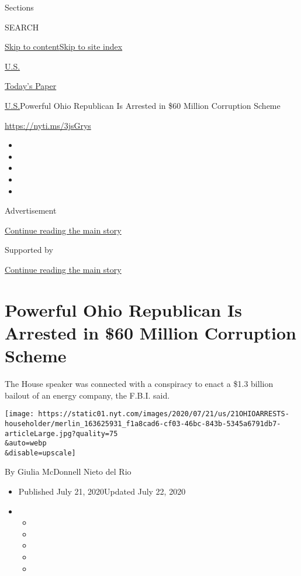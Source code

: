 Sections

SEARCH

\protect\hyperlink{site-content}{Skip to
content}\protect\hyperlink{site-index}{Skip to site index}

\href{https://www.nytimes.com/section/us}{U.S.}

\href{https://myaccount.nytimes.com/auth/login?response_type=cookie\&client_id=vi}{}

\href{https://www.nytimes.com/section/todayspaper}{Today's Paper}

\href{/section/us}{U.S.}\textbar{}Powerful Ohio Republican Is Arrested
in \$60 Million Corruption Scheme

\url{https://nyti.ms/3jsGrys}

\begin{itemize}
\item
\item
\item
\item
\item
\end{itemize}

Advertisement

\protect\hyperlink{after-top}{Continue reading the main story}

Supported by

\protect\hyperlink{after-sponsor}{Continue reading the main story}

\hypertarget{powerful-ohio-republican-is-arrested-in-60-million-corruption-scheme}{%
\section{Powerful Ohio Republican Is Arrested in \$60 Million Corruption
Scheme}\label{powerful-ohio-republican-is-arrested-in-60-million-corruption-scheme}}

The House speaker was connected with a conspiracy to enact a \$1.3
billion bailout of an energy company, the F.B.I. said.

\texttt{[image: https://static01.nyt.com/images/2020/07/21/us/21OHIOARRESTS-householder/merlin\_163625931\_f1a8cad6-cf03-46bc-843b-5345a6791db7-articleLarge.jpg?quality=75\\\&auto=webp\\\&disable=upscale]}

By Giulia McDonnell Nieto del Rio

\begin{itemize}
\item
  Published July 21, 2020Updated July 22, 2020
\item
  \begin{itemize}
  \item
  \item
  \item
  \item
  \item
  \end{itemize}
\end{itemize}

